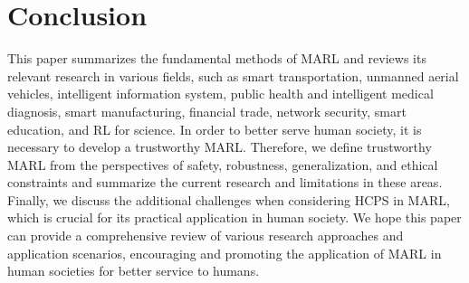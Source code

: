 \documentclass[acmsmall]{acmart}
\begin{document}
\section{Conclusion} \label{Conclusion}
This paper summarizes the fundamental methods of MARL and reviews its relevant research in various fields, such as smart transportation, unmanned aerial vehicles, intelligent information system, public health and intelligent medical diagnosis, smart manufacturing, financial trade, network security, smart education, and RL for science. In order to better serve human society, it is necessary to develop a trustworthy MARL. Therefore, we define trustworthy MARL from the perspectives of safety, robustness, generalization, and ethical constraints and summarize the current research and limitations in these areas. 
Finally, we discuss the additional challenges when considering HCPS in MARL, which is crucial for its practical application in human society.
We hope this paper can provide a comprehensive review of various research approaches and application scenarios, encouraging and promoting the application of MARL in human societies for better service to humans.




\end{document}
